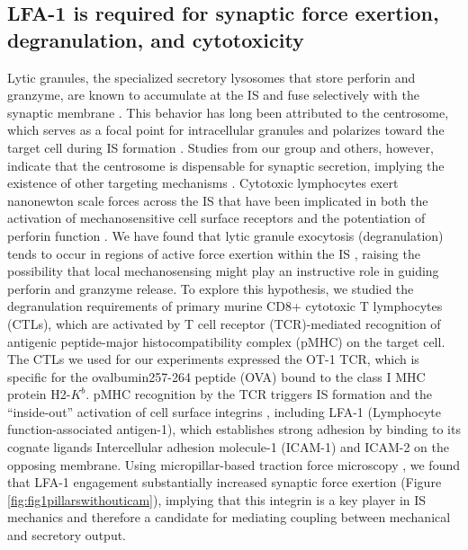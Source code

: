 \subsection{LFA-1 is required for synaptic force exertion, degranulation, and cytotoxicity}
Lytic granules, the specialized secretory lysosomes that store perforin and granzyme, are known to accumulate at the IS and fuse selectively with the synaptic membrane \cite{Stinchcombe2007, Chang2017}. This behavior has long been attributed to the centrosome, which serves as a focal point for intracellular granules and polarizes toward the target cell during IS formation \cite{Stinchcombe2007, Huse2013}. Studies from our group and others, however, indicate that the centrosome is dispensable for synaptic secretion, implying the existence of other targeting mechanisms \cite{Tamzalit2020, Bertrand2013, Butler2009}. Cytotoxic lymphocytes exert nanonewton scale forces across the IS that have been implicated in both the activation of mechanosensitive cell surface receptors and the potentiation of perforin function \cite{Basu2016, Hu2016, Lee2015, Comrie2015_2, Tamzalit2018, Hui2015, Liu2014}. We have found that lytic granule exocytosis (degranulation) tends to occur in regions of active force exertion within the IS \cite{Basu2016}, raising the possibility that local mechanosensing might play an instructive role in guiding perforin and granzyme release. To explore this hypothesis, we studied the degranulation requirements of primary murine CD8+ cytotoxic T lymphocytes (CTLs), which are activated by T cell receptor (TCR)-mediated recognition of antigenic peptide-major histocompatibility complex (pMHC) on the target cell. The CTLs we used for our experiments expressed the OT-1 TCR, which is specific for the ovalbumin257-264 peptide (OVA) bound to the class I MHC protein H2-$K^{b}$. pMHC recognition by the TCR triggers IS formation and the “inside-out” activation of cell surface integrins \cite{Dustin2010, Kinashi2005}, including LFA-1 (Lymphocyte function-associated antigen-1), which establishes strong adhesion by binding to its cognate ligands Intercellular adhesion molecule-1 (ICAM-1) and ICAM-2 on the opposing membrane. Using micropillar-based traction force microscopy \cite{Bashour2014}, we found that LFA-1 engagement substantially increased synaptic force exertion (Figure \ref{fig:fig1pillarswithouticam}), implying that this integrin is a key player in IS mechanics and therefore a candidate for mediating coupling between mechanical and secretory output. 

